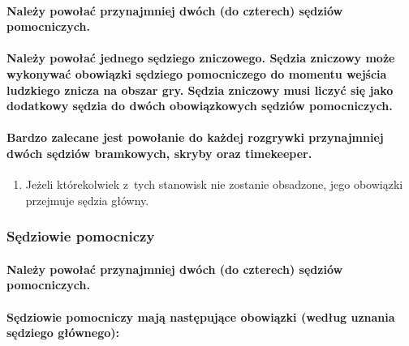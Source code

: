 \documentclass[12pt]{article}
\begin{document}
\paragraph{Należy powołać przynajmniej dwóch (do czterech)
	sędziów pomocniczych.}

\paragraph{Należy powołać jednego sędziego zniczowego. Sędzia
	zniczowy może wykonywać obowiązki sędziego pomocniczego do momentu
	wejścia ludzkiego znicza na obszar gry. Sędzia zniczowy musi liczyć się
	jako dodatkowy sędzia do dwóch obowiązkowych sędziów pomocniczych.}

\paragraph{Bardzo zalecane jest powołanie do każdej rozgrywki
	przynajmniej dwóch sędziów bramkowych, skryby oraz timekeeper.}

\begin{enumerate}
	\item
	      Jeżeli którekolwiek z~tych stanowisk nie zostanie obsadzone, jego
	      obowiązki przejmuje sędzia główny.
\end{enumerate}

\subsubsection{Sędziowie pomocniczy}

\paragraph{Należy powołać przynajmniej dwóch (do czterech)
	sędziów pomocniczych.}

\paragraph{Sędziowie pomocniczy mają następujące obowiązki
	(według uznania sędziego głównego):}
\end{document}
